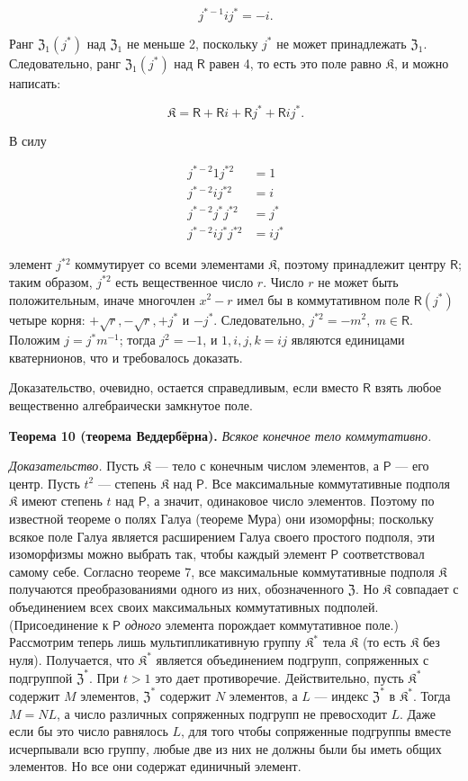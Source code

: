 \documentclass[11pt]{article}
\begin{document}
\[
j^{*-1}ij^*=-i.
\]

Ранг \(\mathfrak Z_1(j^*)\) над \(\mathfrak Z_1\) не меньше 2, поскольку \(j^*\) не может принадлежать \(\mathfrak Z_1\). Следовательно, ранг \(\mathfrak Z_1(j^*)\) над \(\mathsf{R}\) равен 4, то есть это поле равно \(\mathfrak K\), и можно написать:

\[
\mathfrak K=\mathsf R+\mathsf Ri+\mathsf Rj^*+\mathsf Rij^*.
\]

В силу

\[
\begin{aligned}
j^{*-2}1j^{*2}&=1\\
j^{*-2}ij^{*2}&=i\\
j^{*-2}j^*j^{*2}&=j^*\\
j^{*-2}ij^*j^{*2}&=ij^*
\end{aligned}
\]

элемент \(j^{*2}\) коммутирует со всеми элементами \(\mathfrak K\), поэтому принадлежит центру \(\mathsf{R}\); таким образом, \(j^{*2}\) есть вещественное число \(r\). Число \(r\) не может быть положительным, иначе многочлен \(x^2-r\) имел бы в коммутативном поле \(\mathsf{R}(j^*)\) четыре корня: \(+\sqrt r,-\sqrt r,+j^*\) и \(-j^*\). Следовательно, \(j^{*2}=-m^2,\ m\in \mathsf{R}\). Положим \(j=j^*m^{-1}\); тогда \(j^2=-1\), и \(1,i,j,k=ij\) являются единицами кватернионов, что и требовалось доказать.

Доказательство, очевидно, остается справедливым, если вместо \(\mathsf{R}\) взять любое вещественно алгебраически замкнутое поле.

\textbf{Теорема 10 (теорема Веддербёрна).} \emph{Всякое конечное тело коммутативно.}

\emph{Доказательство.} Пусть \(\mathfrak K\) --- тело с конечным числом элементов, а \(\mathsf P\) --- его центр. Пусть \(t^2\) --- степень \(\mathfrak K\) над \(\mathsf P\). Все максимальные коммутативные подполя \(\mathfrak K\) имеют степень \(t\) над \(\mathsf P\), а значит, одинаковое число элементов. Поэтому по известной теореме о полях Галуа (теореме Мура) они изоморфны; поскольку всякое поле Галуа является расширением Галуа своего простого подполя, эти изоморфизмы можно выбрать так, чтобы каждый элемент \(\mathsf P\) соответствовал самому себе. Согласно теореме 7, все максимальные коммутативные подполя \(\mathfrak K\) получаются преобразованиями одного из них, обозначенного \(\mathfrak Z\). Но \(\mathfrak K\) совпадает с объединением всех своих максимальных коммутативных подполей. (Присоединение к \(\mathsf P\) \emph{одного} элемента порождает коммутативное поле.) Рассмотрим теперь лишь мультипликативную группу \(\mathfrak K^*\) тела \(\mathfrak K\) (то есть \(\mathfrak K\) без нуля). Получается, что \(\mathfrak K^*\) является объединением подгрупп, сопряженных с подгруппой \(\mathfrak Z^*\). При \(t>1\) это дает противоречие. Действительно, пусть \(\mathfrak K^*\) содержит \(M\) элементов, \(\mathfrak Z^*\) содержит \(N\) элементов, а \(L\) --- индекс \(\mathfrak Z^*\) в \(\mathfrak K^*\). Тогда \(M=NL\), а число различных сопряженных подгрупп не превосходит \(L\). Даже если бы это число равнялось \(L\), для того чтобы сопряженные подгруппы вместе исчерпывали всю группу, любые две из них не должны были бы иметь общих элементов. Но все они содержат единичный элемент.
\end{document}
